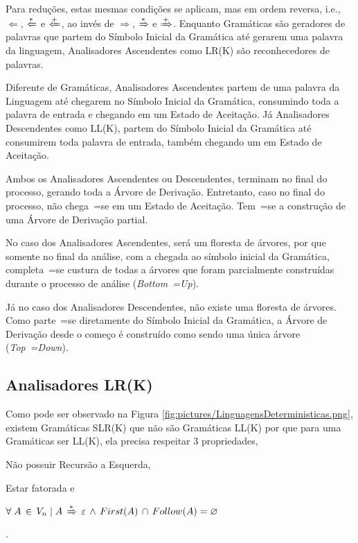 {    Para reduções,
    estas mesmas condições se aplicam,
    mas em ordem reversa,
    i.e., $\Leftarrow$, $\xLeftarrow{*}$ e $\xLeftarrow{+}$,
    ao invés de $\Rightarrow$,
    $\xRightarrow{*}$ e
    $\xRightarrow{+}$.
    Enquanto Gramáticas são geradores de palavras que partem do Símbolo Inicial da Gramática até gerarem uma palavra da linguagem,
    Analisadores Ascendentes como LR(K) são reconhecedores de palavras.

    Diferente de Gramáticas,
    Analisadores Ascendentes partem de uma palavra da Linguagem até chegarem no Símbolo Inicial da Gramática,
    consumindo toda a palavra de entrada e
    chegando em um Estado de Aceitação.
    Já Analisadores Descendentes como LL(K),
    partem do Símbolo Inicial da Gramática até consumirem toda palavra de entrada,
    também chegando um em Estado de Aceitação.

    Ambos os Analisadores Ascendentes ou
    Descendentes,
    terminam no final do processo,
    gerando toda a Árvore de Derivação.
    Entretanto,
    caso no final do processo,
    não chega~=se em um Estado de Aceitação.
    Tem~=se a construção de uma Árvore de Derivação partial.

    No caso dos Analisadores Ascendentes,
    será um floresta de árvores,
    por que somente no final da análise,
    com a chegada ao símbolo inicial da Gramática,
    completa~=se custura de todas a árvores que foram parcialmente construídas durante o processo de análise (\textit{Bottom~=Up}).

    Já no caso dos Analisadores Descendentes,
    não existe uma floresta de árvores.
    Como parte~=se diretamente do Símbolo Inicial da Gramática,
    a Árvore de Derivação desde o começo é construído como sendo uma única árvore (\textit{Top~=Down}).


\subsection{Analisadores LR(K)}

    Como pode ser observado na Figura \ref{fig:pictures/LinguagensDeterministicas.png},
    existem Gramáticas SLR(K) que não são Gramáticas LL(K) por que para uma Gramáticas ser LL(K),
    ela precisa respeitar 3 propriedades,
    \begin{inparaenum}
        \item Não possuir Recursão a Esquerda,
        \item Estar fatorada e
        \item $\forall\; A\, \in\, V_n\; |\; A\,
                \xRightarrow{*}\, \varepsilon\,
                \land\, First(A)\, \cap\, Follow(A) = \varnothing$
    \end{inparaenum}
    \cite{ahoCompilerDragonBook}.

}
